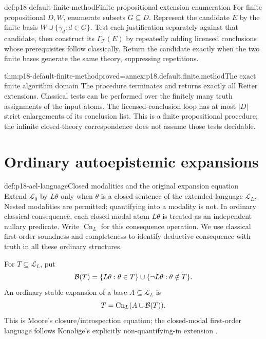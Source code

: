 \begin{hbmethod}{def:p18-default-finite-method}{Finite propositional extension enumeration}
For finite propositional \(D,W\), enumerate
subsets \(G\subseteq D\). Represent the
candidate \(E\) by the finite basis
\(W\cup\{\gamma_d:d\in G\}\).
Test each justification separately against
that candidate, then construct its
\(\Gamma_{\mathcal T}(E)\) by repeatedly
adding licensed conclusions whose
prerequisites follow classically.
Return the candidate exactly when
the two finite bases generate the
same theory, suppressing repetitions.
\end{hbmethod}

\begin{hbtheorem}{thm:p18-default-finite-method}{proved=annex:p18.default.finite.method}{The exact finite algorithm domain}
The procedure terminates and returns exactly
all Reiter extensions. Classical tests can
be performed over the finitely many truth
assignments of the input atoms. The
licensed-conclusion loop has at most
\(|D|\) strict enlargements of its
conclusion list. This is a finite
propositional procedure; the infinite
closed-theory correspondence does not
assume those tests decidable.
\end{hbtheorem}

\section{Ordinary autoepistemic expansions}

\begin{hbdefinition}{def:p18-ael-language}{Closed modalities and the original expansion equation}
Extend \(\mathcal L_0\) by \(L\theta\) only
when \(\theta\) is a closed sentence of
the extended language \(\mathcal L_L\).
Nested modalities are permitted; quantifying
into a modality is not. In ordinary
classical consequence, each closed modal
atom \(L\theta\) is treated as an
independent nullary predicate.
Write \(\operatorname{Cn}_L\) for this
consequence operation.
We use classical first-order soundness
and completeness to identify deductive
consequence with truth in all these
ordinary structures.

For \(T\subseteq\mathcal L_L\), put
\[
 {\cal B}(T)=\{L\theta:\theta\in T\}
                          \cup\{\neg L\theta:\theta\notin T\}.
\]
An ordinary stable expansion of a base
\(A\subseteq\mathcal L_L\) is
\[
                       T=\operatorname{Cn}_L(A\cup{\cal B}(T)).
\]
This is Moore's closure/introspection
equation; the closed-modal first-order
language follows Konolige's explicitly
non-quantifying-in extension
\cite[pp.~274--277]{Moore1983Autoepistemic}
\cite[sec.~2.1]{Konolige1987DefaultAutoepistemic}.
\end{hbdefinition}

